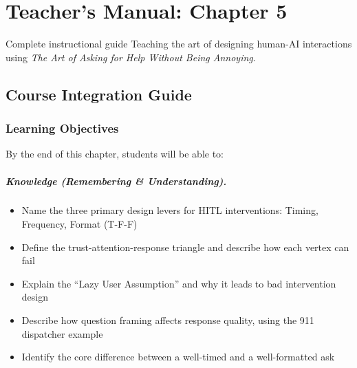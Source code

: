 
\chapter{Teacher's Manual: Chapter 5}
\label{ch:teacher-ch05}

\begin{chapterquote}{Complete instructional guide}
Teaching the art of designing human-AI interactions using \emph{The Art of Asking for Help Without Being Annoying}.
\end{chapterquote}

\section{Course Integration Guide}

\subsection{Learning Objectives}

By the end of this chapter, students will be able to:

\paragraph{Knowledge (Remembering \& Understanding).}
\begin{itemize}
    \item Name the three primary design levers for HITL interventions: Timing, Frequency, Format (T-F-F)
    \item Define the trust-attention-response triangle and describe how each vertex can fail
    \item Explain the ``Lazy User Assumption'' and why it leads to bad intervention design
    \item Describe how question framing affects response quality, using the 911 dispatcher example
    \item Identify the core difference between a well-timed and a well-formatted ask
\end{itemize}

